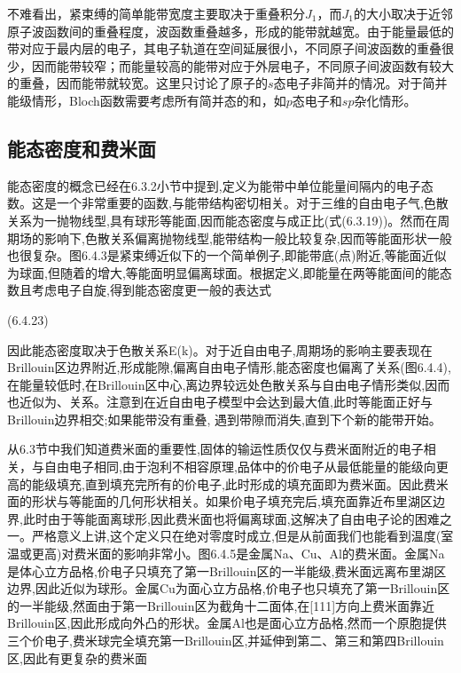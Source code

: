 不难看出，紧束缚的简单能带宽度主要取决于重叠积分$J_1$，而$J_1$的大小取决于近邻原子波函数间的重叠程度，波函数重叠越多，形成的能带就越宽。由于能量最低的带对应于最内层的电子，其电子轨道在空间延展很小，不同原子间波函数的重叠很少，因而能带较窄；而能量较高的能带对应于外层电子，不同原子间波函数有较大的重叠，因而能带就较宽。这里只讨论了原子的$s$态电子非简并的情况。对于简并能级情形，Bloch函数需要考虑所有简并态的和，如$p$态电子和$sp$杂化情形。%

\subsection{能态密度和费米面}

能态密度的概念已经在6.3.2小节中提到,定义为能带中单位能量间隔内的电子态数。这是一个非常重要的函数,与能带结构密切相关。对于三维的自由电子气,色散关系为一抛物线型,具有球形等能面,因而能态密度与成正比(式(6.3.19))。然而在周期场的影响下,色散关系偏离抛物线型,能带结构一般比较复杂,因而等能面形状一般也很复杂。图6.4.3是紧束缚近似下的一个简单例子,即能带底(点)附近,等能面近似为球面,但随着的增大,等能面明显偏离球面。根据定义,即能量在两等能面间的能态数且考虑电子自旋,得到能态密度更一般的表达式

 	(6.4.23)



因此能态密度取决于色散关系E(k)。对于近自由电子,周期场的影响主要表现在Brillouin区边界附近,形成能隙,偏离自由电子情形,能态密度也偏离了关系(图6.4.4),在能量较低时,在Brillouin区中心,离边界较远处色散关系与自由电子情形类似,因而也近似为、关系。注意到在近自由电子模型中会达到最大值,此时等能面正好与Brillouin边界相交;如果能带没有重叠, 遇到带隙而消失,直到下个新的能带开始。

从6.3节中我们知道费米面的重要性,固体的输运性质仅仅与费米面附近的电子相关，与自由电子相同,由于泡利不相容原理,品体中的价电子从最低能量的能级向更高的能级填充,直到填充完所有的价电子,此时形成的填充面即为费米面。因此费米面的形状与等能面的几何形状相关。如果价电子填充完后,填充面靠近布里湖区边界,此时由于等能面离球形,因此费米面也将偏离球面,这解决了自由电子论的困难之一。严格意义上讲,这个定义只在绝对零度时成立,但是从前面我们也能看到温度(室温或更高)对费米面的影响非常小。图6.4.5是金属Na、Cu、Al的费米面。金属Na是体心立方品格,价电子只填充了第一Brillouin区的一半能级,费米面远离布里湖区边界,因此近似为球形。金属Cu为面心立方品格,价电子也只填充了第一Brillouin区的一半能级,然面由于第一Brillouin区为截角十二面体,在[111]方向上费米面靠近Brillouin区,因此形成向外凸的形状。金属Al也是面心立方品格,然而一个原胞提供三个价电子,费米球完全填充第一Brillouin区,并延伸到第二、第三和第四Brillouin区,因此有更复杂的费米面



